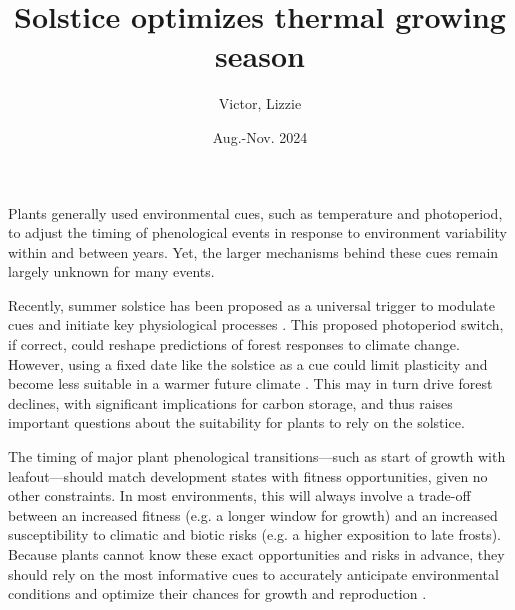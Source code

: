 \documentclass[11pt,letter]{article}
\title{Solstice optimizes thermal growing season}
\author{Victor, Lizzie}
\date{Aug.-Nov. 2024}
\begin{document}
\maketitle


Plants generally used environmental cues, such as temperature and photoperiod, to adjust the timing of phenological events in response to environment variability within and between years. Yet, the larger mechanisms behind these cues remain largely unknown for many events. 

Recently, summer solstice has been proposed as a universal trigger to modulate cues and initiate key physiological processes \cite{Zohner2023, Journe2024}. This proposed photoperiod switch, if correct, could reshape predictions of forest responses to climate change. However, using a fixed date like the solstice as a cue could limit plasticity and become less suitable in a warmer future climate \cite{Wolkovich2021}. 
This may in turn drive forest declines, with significant implications for carbon storage, and thus raises important questions about the suitability for plants to rely on the solstice. 

The timing of major plant phenological transitions---such as start of growth with leafout---should match development states with fitness opportunities, given no other constraints. In most environments, this will always involve a trade-off between an increased fitness (e.g. a longer window for growth) and an increased susceptibility to climatic and biotic risks (e.g. a higher exposition to late frosts). Because plants cannot know these exact opportunities and risks in advance, they should rely on the most informative cues to accurately anticipate environmental conditions and optimize their chances for growth and reproduction \cite{Chevin2015, Bonamour2019}.
\end{document}

